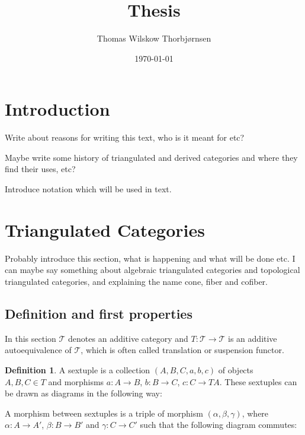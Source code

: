 \documentclass[12pt]{article}
\title{Thesis}
\author{Thomas Wilskow Thorbjørnsen}
\date{\today}
\theoremstyle{definition}
\newtheorem{definition}{Definition}[section]
\theoremstyle{remark}
\begin{document}
    \maketitle
    \section{Introduction}
    
    Write about reasons for writing this text, who is it meant for etc?

    Maybe write some history of triangulated and derived categories and where they find their uses, etc?

    Introduce notation which will be used in text.
    \section{Triangulated Categories}
        Probably introduce this section, what is happening and what will be done etc. I can maybe say something about algebraic triangulated categories and topological triangulated categories, and explaining the name cone, fiber and cofiber.
        \subsection{Definition and first properties}
        In this section $\mathcal{T}$ denotes an additive category and $T:\mathcal{T}\rightarrow\mathcal{T}$ is an additive autoequivalence of $\mathcal{T}$, which is often called translation or suspension functor.
        \begin{definition}
            A sextuple is a collection $(A,B,C,a,b,c)$ of objects \\ $A,B,C\in T$ and morphisms $a:A\rightarrow B$, $b:B\rightarrow C$, $c:C\rightarrow TA$. These sextuples can be drawn as diagrams in the following way:

            \begin{center}
            \end{center}

            A morphism between sextuples is a triple of morphism $(\alpha, \beta, \gamma)$, where $\alpha : A \rightarrow A'$, $\beta : B \rightarrow B'$ and $\gamma : C \rightarrow C'$ such that the following diagram commutes:

        \begin{center}
        \end{center}

        \end{definition}
\end{document}
